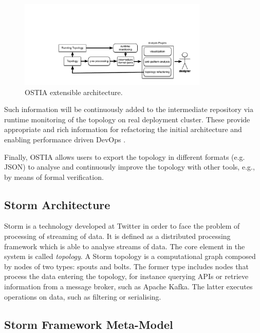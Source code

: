 \begin{figure}[H]
	\begin{center}
		\includegraphics[width=9cm]{images/ostia-arch}
		\caption{OSTIA extensible architecture.}\label{arch}
	\end{center}
\end{figure}

Such information will be continuously added to the intermediate repository via
runtime monitoring of the topology on real deployment cluster. These provide
appropriate and rich information for refactoring the initial architecture and
enabling performance driven DevOps \cite{brunnert2015performance}.

Finally, OSTIA allows users to export the topology in different formats
(e.g. JSON) to analyse and continuously improve the topology with other tools, e.g., by means of formal verification.

\subsection{Storm Architecture}

Storm is a technology developed at Twitter \cite{toshniwal2014storm} in order to
face the problem of processing of streaming of data. It is defined as a
distributed processing framework which is able to analyse streams of data. The
core element in the system is called \emph{topology}. A Storm topology is a
computational graph composed by nodes of two types: spouts and bolts. The former
type includes nodes that process the data entering the topology, for instance
querying APIs or retrieve information from a message broker, such as Apache
Kafka. The latter executes operations on data, such as filtering or serialising.

\subsection{Storm Framework Meta-Model}


